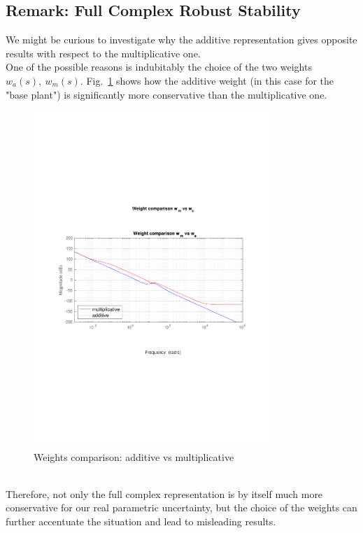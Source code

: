 \documentclass[a4paper, 12pt]{article}
\def\FigureNine{\centering\includegraphics[width=0.8\textwidth]{Figures/fig09.pdf}}
\begin{document}
\subsection*{Remark: Full Complex Robust Stability}
We might be curious to investigate why the additive representation gives opposite results with respect to the multiplicative one.
\\One of the possible reasons is indubitably the choice of the two weights $w_a(s),\ w_m(s)$. Fig.~\ref{fig:fig09} shows how the additive weight (in this case for the "base plant") is significantly more conservative than the multiplicative one.
\begin{figure}[h!]
    \FigureNine
    \caption{Weights comparison: additive vs multiplicative}
    \label{fig:fig09}
\end{figure}
\\Therefore, not only the full complex representation is by itself much more conservative for our real parametric uncertainty, but the choice of the weights can further accentuate the situation and lead to misleading results.
\end{document}
